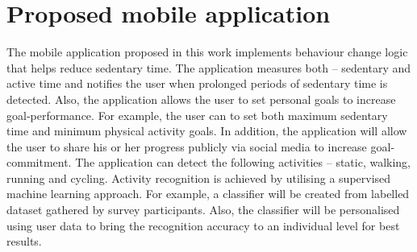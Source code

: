 \section{Proposed mobile application}
The mobile application proposed in this work implements behaviour change logic that helps reduce sedentary time. The application measures both – sedentary and active time and notifies the user when prolonged periods of sedentary time is detected. Also, the application allows the user to set personal goals to increase goal-performance. For example, the user can to set both maximum sedentary time and minimum physical activity goals. In addition, the application will allow the user to share his or her progress publicly via social media to increase goal-commitment. The application can detect the following activities – static, walking, running and cycling. Activity recognition is achieved by utilising a supervised machine learning approach. For example, a classifier will be created from labelled dataset gathered by survey participants. Also, the classifier will be personalised using user data to bring the recognition accuracy to an individual level for best results. 